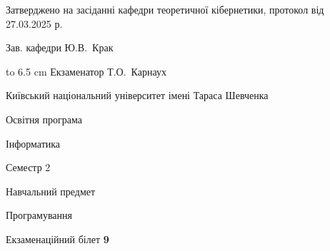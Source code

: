 \documentclass[12pt, ukrainian]{article}
\begin{document}
{\smallskip\smallskip \begin {scriptsize} Затверджено на засіданні кафедри теоретичної кібернетики, протокол   від   27.03.2025 р.\par\smallskip\smallskip\smallskip\smallskip
{\parbox {6.5 cm} {Зав. кафедри \dotfill Ю.В.~Крак}}\hspace {0.7cm} {\hbox to 6.5 cm { Екзаменатор \dotfill Т.О.~Карнаух}} \end{scriptsize}}
\newpage
{{\begin {scriptsize}\par
{ \center  Київський національний університет імені Тараса Шевченка \par}
{\parbox {5 cm}{Освітня програма \hfill}{\parbox {7 cm}{Інформатика\hfill}}\parbox {6 cm}{\hfill Семестр 2}}\par
{\parbox {5 cm} {Навчальний предмет \hfill}\parbox {7 cm}{Програмування \hfill}\parbox {6cm}{\hfill}\par}\vspace{-15pt} \end{scriptsize}}{\center Екзаменаційний білет \No \textbf { 9 }\par}}
\end{document}
